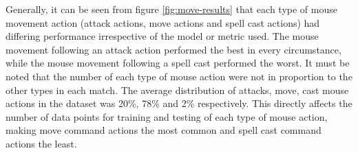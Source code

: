 \documentclass[Report.tex]{subfiles}
\newcommand{\newaxis}[7]{
\begin{axis}[
    ybar,
    title={#1},
    ymin=#3, ymax=#4,
    bar width=1em,
    width={#5},
    height={#6},
    legend style={at={#7},anchor=north,legend columns=-1},
    enlarge x limits=0.4,
    x tick label style={align=center,text width=2cm},
    symbolic x coords={Logistic Regression, Random Forest, Multi-layer Perceptron},
    xtick=data,
    ylabel={#2}
]
}
\begin{document}
Generally, it can be seen from figure \ref{fig:move-results} that each type of mouse movement action (attack actions, move actions and spell cast actions) had differing performance irrespective of the model or metric used. The mouse movement following an attack action performed the best in every circumstance, while the mouse movement following a spell cast performed the worst. It must be noted that the number of each type of mouse action were not in proportion to the other types in each match. The average distribution of attacks, move, cast mouse actions in the dataset was 20\%, 78\% and 2\% respectively. This directly affects the number of data points for training and testing of each type of mouse action, making move command actions the most common and spell cast command actions the least. 
\begin{figure}[H]
\begin{subfigure}{1\textwidth}
\centering
{}
\end{subfigure}

\begin{subfigure}{0.45\textwidth}
\end{subfigure}
\end{figure}
\end{document}

